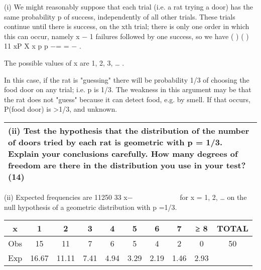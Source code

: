 \documentclass[a4paper,12pt]{article}
\begin{document}
\begin{enumerate} 
 
(i) We might reasonably suppose that each trial (i.e. a rat trying a door) has the same probability p of success, independently of all other trials.  These trials continue until there is success, on the xth trial;  there is only one order in which this can occur, namely x − 1 failures followed by one success, so we have ( ) ( ) 11 xP X x p p −= = − . 
 
The possible values of x are 1, 2, 3, … . 
 
In this case, if the rat is "guessing" there will be probability 1/3 of choosing the food door on any trial;  i.e. p is 1/3.  The weakness in this argument may be that the rat does not "guess" because it can detect food, e.g. by smell.  If that occurs, P(food door) is >1/3, and unknown. 

\newpage

\begin{table}[ht!]
 
\centering
 
\begin{tabular}{|p{15cm}|}
 
\hline  
 
 
(ii) Test the hypothesis that the distribution of the number of doors tried by each rat is geometric with  p = 1/3.   Explain your conclusions carefully.   How many degrees of freedom are there in the distribution you use in your test? (14) 
 
\\ \hline
  
\end{tabular}

\end{table} 
 
(ii) Expected frequencies are 
11250 33 x−         
 for x = 1, 2, … on the null hypothesis 
of a geometric distribution with p =1/3. 

\begin{tabular}{cccccccccc} 
x & 1&  2&  3&  4&  5 & 6 & 7&  ≥ 8 & TOTAL \\ \hline  
Obs & 15&  11&  7&  6 & 5 & 4 & 2 & 0 & 50 \\ \hline 
Exp &  16.67 &  11.11& 7.41& 4.94 &3.29 &2.19& 1.46& 2.93 \\ \hline
\end{tabular}


\end{enumerate}
\end{document}
